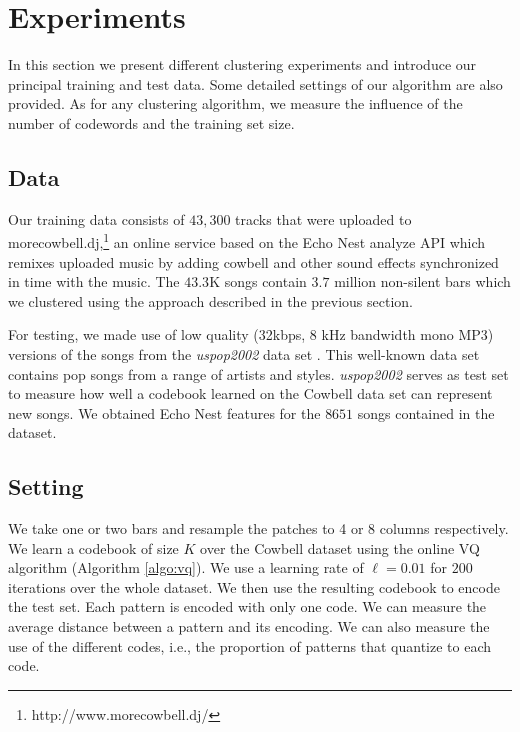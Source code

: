 \documentclass{article}
\newcommand{\ie}{i.e.~}
\begin{document}
\section{Experiments}\label{sec:experiments}
In this section we present different clustering experiments and introduce
our principal training and test data. Some detailed settings
of our algorithm are also provided. As for any clustering algorithm, we
measure the influence of the number of codewords and the training set size.


\subsection{Data}
\label{sec:traindata}
\label{sec:testdata}
Our training data consists of $43,300$ tracks that were uploaded to
morecowbell.dj,\footnote{http://www.morecowbell.dj/} an online service
based on the Echo Nest analyze API which remixes uploaded music by
adding cowbell and other sound effects synchronized in time with the
music.  The $43.3$K songs contain $3.7$ million non-silent
bars which we clustered using the approach described in the previous
section.

For testing, we made use of low quality (32kbps, 8 kHz bandwidth mono MP3) versions of the songs
from the {\it uspop2002} data set \cite{uspop2002}.  This well-known data set 
contains pop songs from a range of artists and styles.
{\it uspop2002} serves as test set to measure how well a codebook learned on
the Cowbell data set can represent new songs.  We obtained Echo Nest features
for the $8651$ songs contained in the dataset.


\subsection{Setting}\label{ssec:setting}
We take one or two bars and resample the patches to 4 or 8 columns 
respectively.  We learn a codebook of size $K$ over the Cowbell
dataset using the online VQ algorithm (Algorithm \ref{algo:vq}). We use a
learning rate of $\ell=0.01$ for $200$ iterations over the whole
dataset.
%
We then use the resulting codebook to encode the test set.
Each pattern is encoded with only one code. We can measure the average
distance between a pattern and its encoding. We can also measure the use
of the different codes, 
i.e., the proportion of patterns that quantize to each code.
\end{document}
